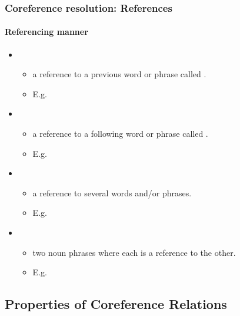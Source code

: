 \documentclass[xcolor=table]{beamer}
\begin{document}
\begin{frame}
	\frametitle{Coreference resolution: References}
	\framesubtitle{Referencing manner}
	
	\begin{itemize}
		\item {}
		\begin{itemize}
			\item a reference to a previous word or phrase called .
			\item E.g. 
		\end{itemize}
	
		\item {}
		\begin{itemize}
			\item a reference to a following word or phrase called .
			\item E.g. 
		\end{itemize}
	
		\item {}
		\begin{itemize}
			\item a reference to several words and/or phrases.
			\item E.g. 
		\end{itemize}
	
		\item {}
		\begin{itemize}
			\item two noun phrases where each is a reference to the other.
			\item E.g. 
		\end{itemize}
	\end{itemize}
	
\end{frame}

\subsection{Properties of Coreference Relations}
\end{document}
